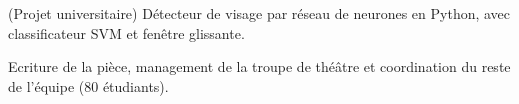 \documentclass[]{cv-template}
\begin{document}
\begin{minipage}[t]{0.65\textwidth}
(Projet universitaire) Détecteur de visage par réseau de neurones en Python, avec classificateur SVM et fenêtre glissante.



Ecriture de la pièce, management de la troupe de théâtre et coordination du reste de l'équipe (80 étudiants).



\sectionsep

\end{minipage}
\end{document}
